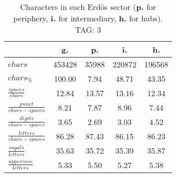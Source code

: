 \begin{table}[h!]
\begin{center}
\begin{tabular}{| l || c | c | c | c |}\hline
 & {\bf g.} & {\bf p.} & {\bf i.} & {\bf h.} \\\hline\hline
$chars$ & 453428  & 35988  & 220872  & 196568 \\
$chars_{\%}$ & 100.00  & 7.94  & 48.71  & 43.35 \\\hline
$\frac{spaces}{chars}$ & 12.84  & 13.57  & 13.16  & 12.34 \\
$\frac{punct}{chars-spaces}$ & 8.21  & 7.87  & 8.96  & 7.44 \\
$\frac{digits}{chars-spaces}$ & 3.65  & 2.69  & 3.03  & 4.52 \\\hline
$\frac{letters}{chars-spaces}$ & 86.28  & 87.43  & 86.15  & 86.23 \\
$\frac{vogals}{letters}$ & 35.63  & 35.72  & 35.39  & 35.87 \\
$\frac{uppercase}{letters}$ & 5.33  & 5.50  & 5.27  & 5.38 \\\hline
\end{tabular}
\caption{Characters in each Erd\"os sector ({{\bf p.}} for periphery, {{\bf i.}} for intermediary, 
    {{\bf h.}} for hubs). TAG: 3}
\end{center}
\end{table}